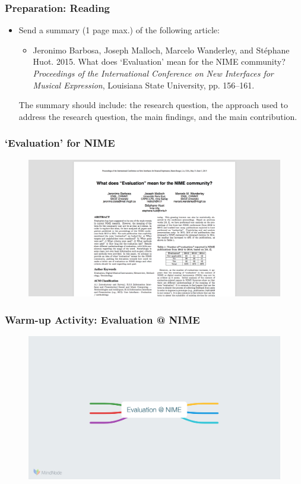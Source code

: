\documentclass[screen, aspectratio=169]{beamer}
\begin{document}
\begin{frame}
\frametitle{Preparation: Reading}
\begin{itemize}
\item Send a summary (1 page max.) of the following article:
\begin{itemize}
\item Jeronimo Barbosa, Joseph Malloch, Marcelo Wanderley, and St\'{e}phane Huot. 2015. What does `Evaluation' mean for the NIME community? \emph{Proceedings of the International Conference on New Interfaces for Musical Expression}, Louisiana State University, pp. 156--161. \cite{Barbosa.et.al.2015.evaluationNIME}\\
\end{itemize}
The summary should include: the research question, the approach used to address the research question, the main findings, and the main contribution.
\end{itemize}
\end{frame}
%
\begin{frame}
\frametitle{`Evaluation' for NIME}
 \begin{figure}
	\includegraphics[scale=0.25]{img/Barbosa-et-al-2015.png}\\
	\cite{Barbosa.et.al.2015.evaluationNIME}
    \end{figure}	
\end{frame}
%
\begin{frame}
\frametitle{Warm-up Activity: Evaluation @ NIME}
 \begin{figure}
	\includegraphics[scale=0.35]{img/mindmap-eval-nime.png}
    \end{figure}	
\end{frame}
\end{document}
